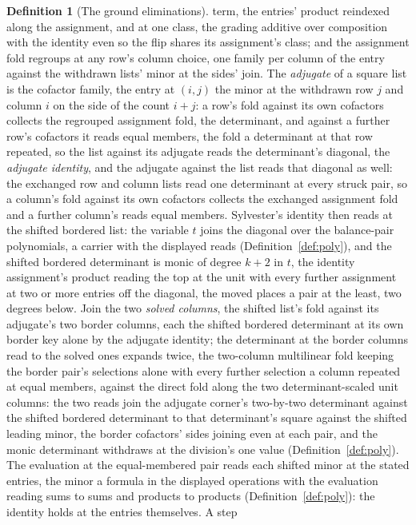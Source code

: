 \documentclass[11pt]{article}
\theoremstyle{definition}
\newtheorem{definition}{Definition}
\begin{document}
\begin{definition}[The ground eliminations]
term, the entries' product reindexed along the assignment, and at
one class, the grading additive over composition with the
identity even so the flip shares its assignment's class; and the
assignment fold regroups
at any row's column choice, one family per column of the entry
against the withdrawn lists' minor at the sides' join. The
\emph{adjugate} of a square list is the cofactor family, the
entry at $(i,j)$ the minor at the withdrawn row $j$ and column
$i$ on the side of the count $i+j$: a row's fold against its own
cofactors collects the regrouped assignment fold, the
determinant, and against a further row's cofactors it reads equal
members, the fold a determinant at that row repeated, so the
list against its adjugate reads the determinant's diagonal, the
\emph{adjugate identity}, and the adjugate against the list reads
that diagonal as well: the exchanged row and column lists read one
determinant at every struck pair, so a column's fold against its
own cofactors collects the exchanged assignment fold and a further
column's reads equal members. Sylvester's identity then reads at the
shifted bordered list: the variable $t$ joins the diagonal over
the balance-pair polynomials, a carrier with the displayed reads
(Definition~\ref{def:poly}), and the shifted bordered determinant
is monic of degree $k+2$ in $t$, the identity assignment's
product reading the top at the unit with every further
assignment at two or more entries off the diagonal, the moved
places a pair at the least, two degrees below. Join the two \emph{solved columns}, the shifted list's
fold against its adjugate's two border columns, each the shifted
bordered determinant at its own border key alone by the adjugate
identity; the determinant at the border columns read to the
solved ones expands twice, the two-column multilinear fold
keeping the border pair's selections alone with every further
selection a column repeated at equal members, against the direct
fold along the two determinant-scaled unit columns: the two
reads join the adjugate corner's two-by-two determinant against
the shifted bordered determinant to that determinant's square
against the shifted leading minor, the border cofactors' sides
joining even at each pair, and the monic determinant withdraws
at the division's one value (Definition~\ref{def:poly}). The
evaluation at the equal-membered pair reads each shifted minor
at the stated entries, the minor a formula in the displayed
operations with the evaluation reading sums to sums and products
to products (Definition~\ref{def:poly}): the identity holds at
the entries themselves. A step

\end{definition}
\end{document}
